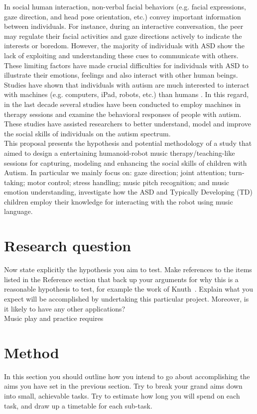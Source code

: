 \documentclass[12pt, a4paper]{article}
\begin{document}
In social human interaction, non-verbal facial behaviors (e.g. facial expressions,
gaze direction, and head pose orientation, etc.) convey important information between
individuals. For instance, during an interactive conversation, the peer may regulate their
facial activities and gaze directions actively to indicate the interests or boredom. However,
the majority of individuals with ASD show the lack of exploiting and understanding these
cues to communicate with others. These limiting factors have made crucial difficulties for
individuals with ASD to illustrate their emotions, feelings and also interact with other
human beings. Studies have shown that individuals with autism are much interested to
interact with machines (e.g. computers, iPad, robots, etc.) than humans \cite{SocialInteract2003}. In this regard,
in the last decade several studies have been conducted to employ machines in therapy
sessions and examine the behavioral responses of people with autism. These studies have
assisted researchers to better understand, model and improve the social skills of individuals
on the autism spectrum.\\

This proposal presents the hypothesis and potential methodology of a study that aimed to design a
entertaining humanoid-robot music therapy/teaching-like sessions for capturing, modeling and 
enhancing the social skills of children with Autism. In particular we mainly focus on: gaze 
direction; joint attention; turn-taking; motor control; stress handling; music pitch recognition;
and music emotion understanding, investigate how the ASD and Typically Developing (TD) children employ 
their knowledge for interacting with the robot using music language.\\

\section*{Research question} Now state explicitly the hypothesis you aim to
test. Make references to the items listed in the Reference section
that back up your arguments for why this is a reasonable
hypothesis to test, for example the work of Knuth~\cite{knuth}.
Explain what you expect will be accomplished by undertaking this
particular project.  Moreover, is it likely to have any other
applications?\\
Music play and practice requires 

 
\section*{Method}
In this section you should outline how you intend to go
about accomplishing the aims you have set in the previous
section. Try to break your grand aims down into small,
achievable tasks. Try to estimate how long you will
spend on each task, and draw up a timetable for each
sub-task.
\end{document}
